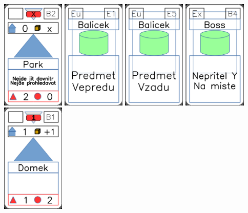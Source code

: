 \documentclass[a4paper]{article}
\begin{document}
	\includegraphics[width=3.0cm]{img-3_21}
	\includegraphics[width=3.0cm]{img-4_20}
	\includegraphics[width=3.0cm]{img-4_24}
	\includegraphics[width=3.0cm]{img-4_8}
	\includegraphics[width=3.0cm]{img-3_5}
\end{document}
